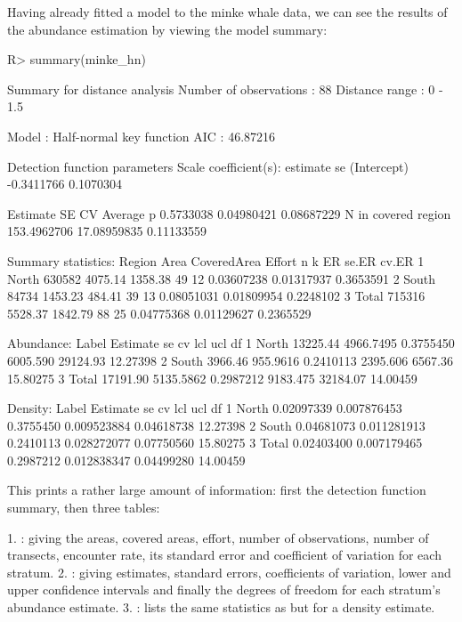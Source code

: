 \documentclass[article]{jss}\usepackage[]{graphicx}\usepackage[]{color}
\begin{document}
Having already fitted a model to the minke whale data, we can see the results of the abundance estimation by viewing the model summary:
\begin{Schunk}
\begin{Sinput}
R> summary(minke_hn)
\end{Sinput}
\begin{Soutput}

Summary for distance analysis 
Number of observations :  88 
Distance range         :  0  -  1.5 

Model : Half-normal key function 
AIC   : 46.87216 

Detection function parameters
Scale coefficient(s):  
              estimate        se
(Intercept) -0.3411766 0.1070304

                       Estimate          SE         CV
Average p             0.5733038  0.04980421 0.08687229
N in covered region 153.4962706 17.08959835 0.11133559

Summary statistics:
  Region   Area CoveredArea  Effort  n  k         ER      se.ER     cv.ER
1  North 630582     4075.14 1358.38 49 12 0.03607238 0.01317937 0.3653591
2  South  84734     1453.23  484.41 39 13 0.08051031 0.01809954 0.2248102
3  Total 715316     5528.37 1842.79 88 25 0.04775368 0.01129627 0.2365529

Abundance:
  Label Estimate        se        cv      lcl      ucl       df
1 North 13225.44 4966.7495 0.3755450 6005.590 29124.93 12.27398
2 South  3966.46  955.9616 0.2410113 2395.606  6567.36 15.80275
3 Total 17191.90 5135.5862 0.2987212 9183.475 32184.07 14.00459

Density:
  Label   Estimate          se        cv         lcl        ucl       df
1 North 0.02097339 0.007876453 0.3755450 0.009523884 0.04618738 12.27398
2 South 0.04681073 0.011281913 0.2410113 0.028272077 0.07750560 15.80275
3 Total 0.02403400 0.007179465 0.2987212 0.012838347 0.04499280 14.00459
\end{Soutput}
\end{Schunk}
This prints a rather large amount of information: first the detection function summary, then three tables:

1. : giving the areas, covered areas, effort, number of observations, number of transects, encounter rate, its standard error and coefficient of variation for each stratum. 
2. : giving estimates, standard errors, coefficients of variation, lower and upper confidence intervals and finally the degrees of freedom for each stratum's abundance estimate.
3. : lists the same statistics as  but for a density estimate.
\end{document}
